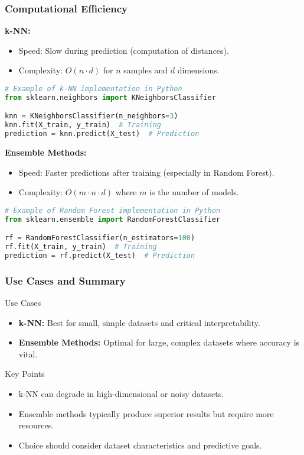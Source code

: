 \documentclass[aspectratio=169]{beamer}
\begin{document}
\begin{frame}[fragile]
    \frametitle{Computational Efficiency}

    \textbf{k-NN:}
    \begin{itemize}
        \item Speed: Slow during prediction (computation of distances).
        \item Complexity: $O(n \cdot d)$ for $n$ samples and $d$ dimensions.
    \end{itemize}

    \begin{lstlisting}[language=Python]
# Example of k-NN implementation in Python
from sklearn.neighbors import KNeighborsClassifier

knn = KNeighborsClassifier(n_neighbors=3)
knn.fit(X_train, y_train)  # Training
prediction = knn.predict(X_test)  # Prediction
    \end{lstlisting}

    \textbf{Ensemble Methods:}
    \begin{itemize}
        \item Speed: Faster predictions after training (especially in Random Forest).
        \item Complexity: $O(m \cdot n \cdot d)$ where $m$ is the number of models.
    \end{itemize}

    \begin{lstlisting}[language=Python]
# Example of Random Forest implementation in Python
from sklearn.ensemble import RandomForestClassifier

rf = RandomForestClassifier(n_estimators=100)
rf.fit(X_train, y_train)  # Training
prediction = rf.predict(X_test)  # Prediction
    \end{lstlisting}
\end{frame}

\begin{frame}[fragile]
    \frametitle{Use Cases and Summary}

    \begin{block}{Use Cases}
        \begin{itemize}
            \item \textbf{k-NN:} Best for small, simple datasets and critical interpretability.
            \item \textbf{Ensemble Methods:} Optimal for large, complex datasets where accuracy is vital.
        \end{itemize}
    \end{block}

    \begin{block}{Key Points}
        \begin{itemize}
            \item k-NN can degrade in high-dimensional or noisy datasets.
            \item Ensemble methods typically produce superior results but require more resources.
            \item Choice should consider dataset characteristics and predictive goals.
        \end{itemize}
    \end{block}
\end{frame}
\end{document}
